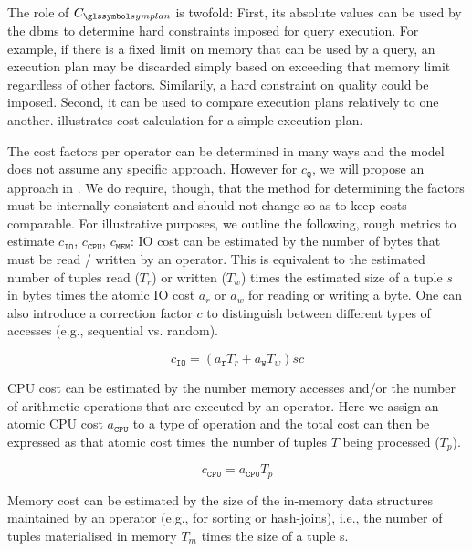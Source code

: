 The role of $C_{\symplan}$ is twofold: First, its absolute values can be used by the \acrshort{dbms} to determine hard constraints imposed for query execution. For example, if there is a fixed limit on memory that can be used by a query, an execution plan may be discarded simply based on exceeding that memory limit regardless of other factors. Similarily, a hard constraint on quality could be imposed. Second, it can be used to compare execution plans relatively to one another.  illustrates cost calculation for a simple execution plan.

The cost factors per operator can be determined in many ways and the model does not assume any specific approach. However for $c_{\mathtt{Q}}$, we will propose an approach in . We do require, though, that the method for determining the factors must be internally consistent and should not change so as to keep costs comparable. For illustrative purposes, we outline the following, rough metrics to estimate $c_{\mathtt{IO}}$, $c_{\mathtt{CPU}}$, $c_{\mathtt{MEM}}$: IO cost can be estimated by the number of bytes that must be read / written by an operator. This is equivalent to the estimated number of tuples read ($T_r$) or written ($T_w$) times the estimated size of a tuple $s$ in bytes times the atomic IO cost $a_{r}$ or $a_{w}$ for reading or writing a byte. One can also introduce a correction factor $c$ to distinguish between different types of accesses (e.g., sequential vs. random).

\begin{equation*}
    c_{\mathtt{IO}} = (a_{\texttt{r}}T_r + a_{\texttt{w}}T_w)sc
\end{equation*}

CPU cost can be estimated by the number memory accesses and/or the number of arithmetic operations that are executed by an operator. Here we assign an atomic CPU cost $a_{\texttt{CPU}}$ to a type of operation and the total cost can then be expressed as that atomic cost times the number of tuples $T$ being processed ($T_p$).

\begin{equation*}
    c_{\mathtt{CPU}} = a_{\texttt{CPU}}T_p
\end{equation*}

Memory cost can be estimated by the size of the in-memory data structures maintained by an operator (e.g., for sorting or hash-joins), i.e., the number of tuples materialised in memory $T_m$ times the size of a tuple s.

